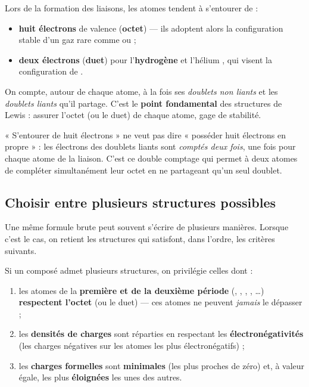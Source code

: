 \documentclass[11pt,a4paper]{article}
\begin{document}
\begin{theoreme}
Lors de la formation des liaisons, les atomes tendent à s'entourer de :
\begin{itemize}[leftmargin=1.6em,topsep=2pt,itemsep=2pt]
  \item \textbf{huit électrons} de valence (\textbf{octet}) — ils adoptent alors la configuration
        stable d'un gaz rare comme  ou  ;
  \item \textbf{deux électrons} (\textbf{duet}) pour l'\textbf{hydrogène}  et l'hélium
        , qui visent la configuration de .
\end{itemize}
On compte, autour de chaque atome, à la fois ses \emph{doublets non liants} et les \emph{doublets
liants} qu'il partage. C'est le \textbf{point fondamental} des structures de Lewis : assurer
l'octet (ou le duet) de chaque atome, gage de stabilité.
\end{theoreme}

\begin{remarque}
« S'entourer de huit électrons » ne veut pas dire « posséder huit électrons en propre » : les
électrons des doublets liants sont \emph{comptés deux fois}, une fois pour chaque atome de la
liaison. C'est ce double comptage qui permet à deux atomes de compléter simultanément leur octet
en ne partageant qu'un seul doublet.
\end{remarque}

\subsection{Choisir entre plusieurs structures possibles}

Une même formule brute peut souvent s'écrire de plusieurs manières. Lorsque c'est le cas, on
retient les structures qui satisfont, dans l'ordre, les critères suivants.

\begin{theoreme}
Si un composé admet plusieurs structures, on privilégie celles dont :
\begin{enumerate}[leftmargin=1.8em,topsep=2pt,itemsep=2pt]
  \item les atomes de la \textbf{première et de la deuxième période} (, , ,
        , \ldots) \textbf{respectent l'octet} (ou le duet) — ces atomes ne peuvent
        \emph{jamais} le dépasser ;
  \item les \textbf{densités de charges} sont réparties en respectant les
        \textbf{électronégativités} (les charges négatives sur les atomes les plus
        électronégatifs) ;
  \item les \textbf{charges formelles} sont \textbf{minimales} (les plus proches de zéro) et,
        à valeur égale, les plus \textbf{éloignées} les unes des autres.
\end{enumerate}
\end{theoreme}
\end{document}
